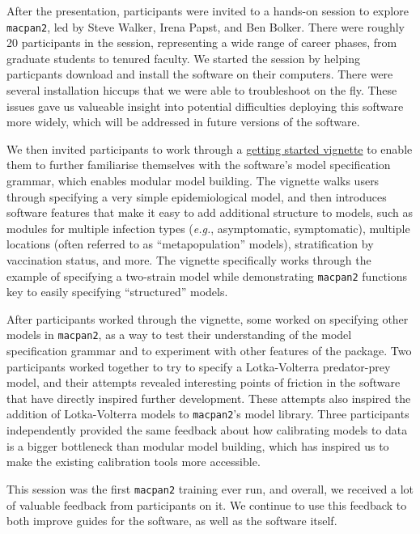\documentclass{article}
\newcommand{\macpan}{\texttt{macpan2}\xspace}
\newcommand{\eg}{\textit{e.g.},\xspace}
\begin{document}
  After the presentation, participants were invited to a hands-on session to explore \macpan, led by Steve Walker, Irena Papst, and Ben Bolker. There were roughly 20 participants in the session, representing a wide range of career phases, from graduate students to tenured faculty. We started the session by helping particpants download and install the software on their computers. There were several installation hiccups that we were able to troubleshoot on the fly. These issues gave us valueable insight into potential difficulties deploying this software more widely, which will be addressed in future versions of the software.

  We then invited participants to work through a \href{https://github.com/canmod/macpan2/blob/refactorcpp/vignettes/quickstart.Rmd}{getting started vignette} to enable them to further familiarise themselves with the software's model specification grammar, which enables modular model building. The vignette walks users through specifying a very simple epidemiological model, and then introduces software features that make it easy to add additional structure to models, such as modules for multiple infection types (\eg asymptomatic, symptomatic), multiple locations (often referred to as ``metapopulation'' models), stratification by vaccination status, and more. The vignette specifically works through the example of specifying a two-strain model while demonstrating \macpan functions key to easily specifying ``structured'' models.

  After participants worked through the vignette, some worked on specifying other models in \macpan, as a way to test their understanding of the model specification grammar and to experiment with other features of the package. Two participants worked together to try to specify a Lotka-Volterra predator-prey model, and their attempts revealed interesting points of friction in the software that have directly inspired further development. These attempts also inspired the addition of Lotka-Volterra models to \macpan's model library. Three participants independently provided the same feedback about how calibrating models to data is a bigger bottleneck than modular model building, which has inspired us to make the existing calibration tools more accessible.

  This session was the first \macpan training ever run, and overall, we received a lot of valuable feedback from participants on it. We continue to use this feedback to both improve guides for the software, as well as the software itself.
\end{document}
